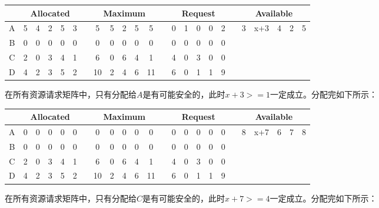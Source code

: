 \begin{solution}
\begin{table}[H]
    \begin{center}
    \begin{tabular}{|c|c|c|c|c|c|c|c|c|c|c|c|c|c|c|c|c|c|c|c|c|c|c|c|}
    \hline
     & \multicolumn{ 5}{c|}{Allocated} &  & \multicolumn{ 5}{c|}{Maximum} &  & \multicolumn{ 5}{c|}{Request} &  & \multicolumn{ 5}{c|}{Available} \\ \hline
    A & 5 & 4 & 2 & 5 & 3 &  & 5 & 5 & 2 & 5 & 5 &  & 0 & 1 & 0 & 0 & 2 &  & 3 & x+3 & 4 & 2 & 5 \\ \hline
    B & 0 & 0 & 0 & 0 & 0 &  & 0 & 0 & 0 & 0 & 0 &  & 0 & 0 & 0 & 0 & 0 &  &  &  &  &  &  \\ \hline
    C & 2 & 0 & 3 & 4 & 1 &  & 6 & 0 & 6 & 4 & 1 &  & 4 & 0 & 3 & 0 & 0 &  &  &  &  &  &  \\ \hline
    D & 4 & 2 & 3 & 5 & 2 &  & 10 & 2 & 4 & 6 & 11 &  & 6 & 0 & 1 & 1 & 9 &  &  &  &  &  &  \\ \hline
    \end{tabular}
    \end{center}
\end{table}

在所有资源请求矩阵中，只有分配给$A$是有可能安全的，此时$x+3>=1$一定成立。分配完如下所示：

\begin{table}[H]
    \begin{center}
    \begin{tabular}{|c|c|c|c|c|c|c|c|c|c|c|c|c|c|c|c|c|c|c|c|c|c|c|c|}
    \hline
     & \multicolumn{ 5}{c|}{Allocated} &  & \multicolumn{ 5}{c|}{Maximum} &  & \multicolumn{ 5}{c|}{Request} &  & \multicolumn{ 5}{c|}{Available} \\ \hline
    A & 0 & 0 & 0 & 0 & 0 &  & 0 & 0 & 0 & 0 & 0 &  & 0 & 0 & 0 & 0 & 0 &  & 8 & x+7 & 6 & 7 & 8 \\ \hline
    B & 0 & 0 & 0 & 0 & 0 &  & 0 & 0 & 0 & 0 & 0 &  & 0 & 0 & 0 & 0 & 0 &  &  &  &  &  &  \\ \hline
    C & 2 & 0 & 3 & 4 & 1 &  & 6 & 0 & 6 & 4 & 1 &  & 4 & 0 & 3 & 0 & 0 &  &  &  &  &  &  \\ \hline
    D & 4 & 2 & 3 & 5 & 2 &  & 10 & 2 & 4 & 6 & 11 &  & 6 & 0 & 1 & 1 & 9 &  &  &  &  &  &  \\ \hline
    \end{tabular}
    \end{center}
\end{table}

在所有资源请求矩阵中，只有分配给$C$是有可能安全的，此时$x+7>=4$一定成立。分配完如下所示：


\end{solution}
